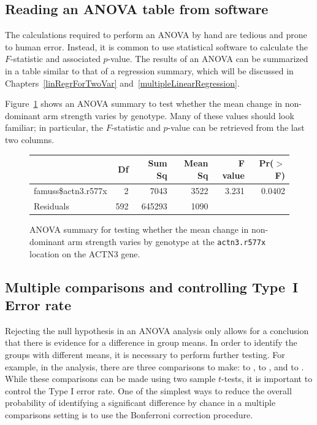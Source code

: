 \textD{\newpage}


\subsection{Reading an ANOVA table from software}

The calculations required to perform an ANOVA by hand are tedious and prone to human error. Instead, it is common to use statistical software to calculate the $F$-statistic and associated $p$-value. The results of an ANOVA can be summarized in a table similar to that of a regression summary, which will be discussed in Chapters~\ref{linRegrForTwoVar} and~\ref{multipleLinearRegression}.

Figure~\ref{anovaSummaryTableForFamuss} shows an ANOVA summary to test whether the mean change in non-dominant arm strength varies by genotype. Many of these values should look familiar; in particular, the $F$-statistic and $p$-value can be retrieved from the last two columns.
\textD{\vspace{5mm}}

\begin{figure}[ht]
	\centering
	\begin{tabular}{lrrrrr}
		\hline
		& Df & Sum Sq & Mean Sq & F value & Pr($>$F) \\ 
		\hline
		famuss\$actn3.r577x & 2 & 7043 & 3522 & 3.231 & 0.0402 \\ 
		Residuals & 592 & 645293 & 1090 &  &  \\    \hline
	\end{tabular}
	\caption{ANOVA summary for testing whether the mean change in non-dominant arm strength varies by genotype at the \texttt{actn3.r577x} location on the ACTN3 gene.}
	\label{anovaSummaryTableForFamuss}
\end{figure}


\subsection{Multiple comparisons and controlling Type~I Error rate}
\label{multipleComparisonsAndControllingTheType1ErrorRate}


Rejecting the null hypothesis in an ANOVA analysis only allows for a conclusion that there is evidence for a difference in group means. In order to identify the groups with different means, it is necessary to perform further testing. For example, in the  analysis, there are three comparisons to make:  to ,  to , and  to . While these comparisons can be made using two sample $t$-tests, it is important to control the Type I error rate. One of the simplest ways to reduce the overall probability of identifying a significant difference by chance in a multiple comparisons setting is to use the Bonferroni correction procedure.

